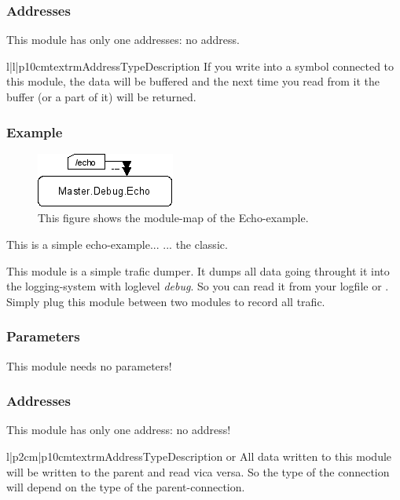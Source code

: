 \subsubsection{Addresses}
This module has only one addresses: no address.
\begin{tableiii}{l|l|p{10cm}}{textrm}{Address}{Type}{Description}
\lineiii{---}
        {}
        {If you write into a symbol connected to this module, the data will be
         buffered and the next time you read from it the buffer (or a part of 
         it) will be returned.}
\end{tableiii}

\subsubsection{Example}
\begin{figure}[ht]
    \label{coremod06}
    \centering
    \includegraphics{coremod06.png}
    \caption{This figure shows the module-map of the Echo-example.}
\end{figure}    
This is a simple echo-example... ... the classic.





%
%
This module is a simple trafic dumper. It dumps all data going throught it
into the logging-system with loglevel \emph{debug}. So you can read it from
your logfile or . Simply plug this module between two modules
to record all trafic.

\subsubsection{Parameters}
This module needs no parameters!

\subsubsection{Addresses}
This module has only one address: no address! 
\begin{tableiii}{l|p{2cm}|p{10cm}}{textrm}{Address}{Type}{Description}
\lineiii{---}
        { or }
        {All data written to this module will be written to the parent and 
         read vica versa. So the type of the connection will depend on the
         type of the parent-connection.}
\end{tableiii}

